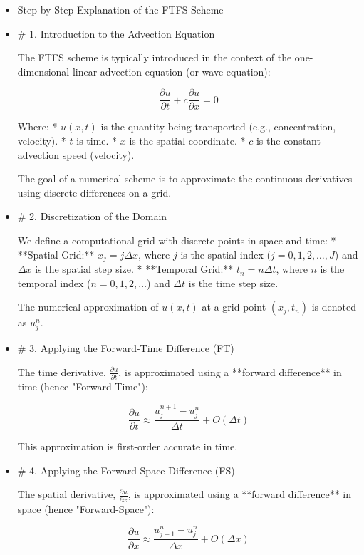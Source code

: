 \documentclass[12pt,a4paper]{report}
\begin{document}
\begin{itemize}

\item  Step-by-Step Explanation of the FTFS Scheme

\item \# 1. Introduction to the Advection Equation

The FTFS scheme is typically introduced in the context of the one-dimensional linear advection equation (or wave equation):

$$\frac{\partial u}{\partial t} + c \frac{\partial u}{\partial x} = 0$$

Where:
*   $u(x, t)$ is the quantity being transported (e.g., concentration, velocity).
*   $t$ is time.
*   $x$ is the spatial coordinate.
*   $c$ is the constant advection speed (velocity).

The goal of a numerical scheme is to approximate the continuous derivatives using discrete differences on a grid.

\item \# 2. Discretization of the Domain

We define a computational grid with discrete points in space and time:
*   **Spatial Grid:** $x_j = j \Delta x$, where $j$ is the spatial index ($j = 0, 1, 2, \dots, J$) and $\Delta x$ is the spatial step size.
*   **Temporal Grid:** $t_n = n \Delta t$, where $n$ is the temporal index ($n = 0, 1, 2, \dots$) and $\Delta t$ is the time step size.

The numerical approximation of $u(x, t)$ at a grid point $(x_j, t_n)$ is denoted as $u_j^n$.

\item \# 3. Applying the Forward-Time Difference (FT)

The time derivative, $\frac{\partial u}{\partial t}$, is approximated using a **forward difference** in time (hence "Forward-Time"):

$$\frac{\partial u}{\partial t} \approx \frac{u_j^{n+1} - u_j^n}{\Delta t} + O(\Delta t)$$

This approximation is first-order accurate in time.

\item \# 4. Applying the Forward-Space Difference (FS)

The spatial derivative, $\frac{\partial u}{\partial x}$, is approximated using a **forward difference** in space (hence "Forward-Space"):

$$\frac{\partial u}{\partial x} \approx \frac{u_{j+1}^n - u_j^n}{\Delta x} + O(\Delta x)$$


\end{itemize}
\end{document}
